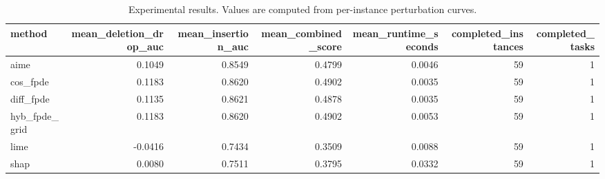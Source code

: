 \begin{table}[t]
\caption{Experimental results. Values are computed from per-instance perturbation curves.}
\label{tab:main_results_computed}
\centering
\begin{tabular}{lrrrrrr}
\toprule
method & mean\_deletion\_drop\_auc & mean\_insertion\_auc & mean\_combined\_score & mean\_runtime\_seconds & completed\_instances & completed\_tasks \\
\midrule
aime & 0.1049 & 0.8549 & 0.4799 & 0.0046 & 59 & 1 \\
cos\_fpde & 0.1183 & 0.8620 & 0.4902 & 0.0035 & 59 & 1 \\
diff\_fpde & 0.1135 & 0.8621 & 0.4878 & 0.0035 & 59 & 1 \\
hyb\_fpde\_grid & 0.1183 & 0.8620 & 0.4902 & 0.0053 & 59 & 1 \\
lime & -0.0416 & 0.7434 & 0.3509 & 0.0088 & 59 & 1 \\
shap & 0.0080 & 0.7511 & 0.3795 & 0.0332 & 59 & 1 \\
\bottomrule
\end{tabular}

\end{table}
